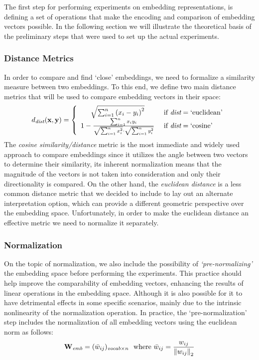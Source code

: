 The first step for performing experiments on embedding representations, is defining a set of operations that make the encoding and comparison of embedding vectors possible.
In the following section we will illustrate the theoretical basis of the preliminary steps that were used to set up the actual experiments.

\subsubsection{Distance Metrics}

In order to compare and find `close' embeddings, we need to formalize a similarity measure between two embeddings. 
To this end, we define two main distance metrics that will be used to compare embedding vectors in their space:
\begin{equation}
    d_{\textit{dist}}(\gbm{x}, \gbm{y}) = 
    \label{eq:method_embeddings_distance}
    \left\{
    \begin{array}{cl}
        \sqrt{\sum_{i=1}^{n}{{(x_i - y_i)}^2}} &\ \text{if}\ \textit{dist} = \text{`euclidean'} \\
        1 - \frac{\sum_{i=1}^{n}{x_i y_i}}{\sqrt{\sum_{i=1}^{n}{x_i^2}} \cdot \sqrt{\sum_{i=1}^{n}{y_i^2}}} &\ \text{if}\ \textit{dist} = \text{`cosine'}
    \end{array}
    \right.
\end{equation}
The \emph{cosine similarity/distance} metric is the most immediate and widely used approach to compare embeddings since it utilizes the angle between two vectors to determine their similarity, its inherent normalization means that the magnitude of the vectors is not taken into consideration and only their directionality is compared.
On the other hand, the \emph{euclidean distance} is a less common distance metric that we decided to include to lay out an alternate interpretation option, which can provide a different geometric perspective over the embedding space.
Unfortunately, in order to make the euclidean distance an effective metric we need to normalize it separately.

\subsubsection{Normalization}

On the topic of normalization, we also include the possibility of \emph{`pre-normalizing'} the embedding space before performing the experiments.
This practice should help improve the comparability of embedding vectors, enhancing the results of linear operations in the embedding space.
Although it is also possible for it to have detrimental effects in some specific scenarios, mainly due to the intrinsic nonlinearity of the normalization operation.
In practice, the `pre-normalization' step includes the normalization of all embedding vectors using the euclidean norm as follows:
\begin{equation}
    \label{eq:method_embeddings_normalization}
    \bm{\mathbf{W}}_{\textit{emb}} = (\bar w_{ij})_{\textit{vocab} \times n}
    \ \ \text{where}\ \bar w_{ij} = \frac{w_{ij}}{{\| w_{ij} \|}_2}
\end{equation}

